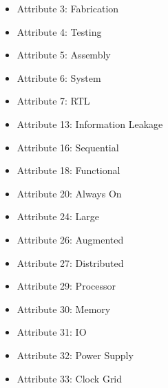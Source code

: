 \documentclass{beamer}
\begin{document}
\begin{frame}
	\begin{itemize}
		\item Attribute 3: Fabrication
		\item Attribute 4: Testing
		\item Attribute 5: Assembly
		\item Attribute 6: System
		\item Attribute 7: RTL
		\item Attribute 13: Information Leakage
		\item Attribute 16: Sequential
		\item Attribute 18: Functional
		\item Attribute 20: Always On
		\item Attribute 24: Large
		\item Attribute 26: Augmented
		\item Attribute 27: Distributed
		\item Attribute 29: Processor
		\item Attribute 30: Memory
		\item Attribute 31: IO
		\item Attribute 32: Power Supply
		\item Attribute 33: Clock Grid
	\end{itemize}
\end{frame}
\end{document}
